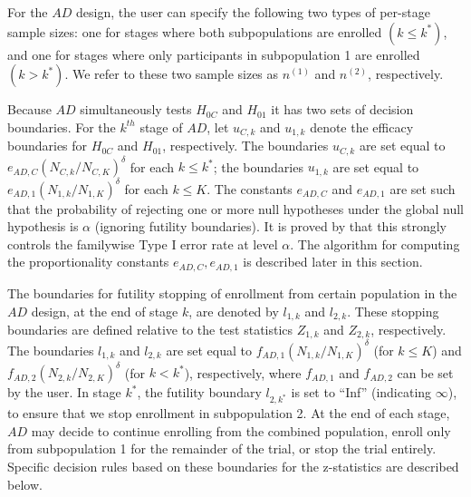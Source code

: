 \documentclass[article]{jss}
\begin{document}
For the $AD$ design, the user can specify the following two types of per-stage sample sizes: one for stages where both subpopulations are enrolled $(k \leq k^*)$, and one for stages where only participants in subpopulation 1 are enrolled $(k > k^*)$. We refer to these two sample sizes as $n^{(1)}$ and $n^{(2)}$, respectively.

Because $AD$ simultaneously tests $H_{0C}$ and $H_{01}$ it has two sets of decision boundaries. For the $k^{th}$ stage of $AD$, let $u_{C,k}$ and $u_{1,k}$ denote the efficacy boundaries for $H_{0C}$ and $H_{01}$, respectively. The boundaries $u_{C,k}$ 
 are set equal to $e_{AD,C}(N_{C,k}/N_{C,K})^{\delta}$ for each $k\leq k^*$; 
the boundaries $u_{1,k}$ are set equal to  $e_{AD,1}(N_{1,k}/N_{1,K})^{\delta}$ for each $k \leq K$. 
The constants $e_{AD,C}$  and $e_{AD,1}$ are set such that the probability of rejecting one or more null hypotheses under the global null hypothesis is $\alpha$ (ignoring futility boundaries). It is proved by \cite{Rosenblum2013AdaptMISTIE} that this strongly controls the familywise Type I error rate at level $\alpha$. The algorithm for computing the proportionality constants $e_{AD,C}, e_{AD,1}$ is described later in this section.


The boundaries for futility stopping of enrollment from certain population in the $AD$ design, at the end of stage $k$, are denoted by $l_{1,k}$ and $l_{2,k}$. These stopping boundaries are defined relative to the test statistics $Z_{1,k}$ and $Z_{2,k}$, respectively. The boundaries $l_{1,k}$ and $l_{2,k}$ are set equal to $f_{AD,1}(N_{1,k}/N_{1,K})^{\delta}$ (for $k\leq K$) and $f_{AD,2}(N_{2,k}/N_{2,K})^{\delta}$ (for $k < k^*$), respectively, where $f_{AD,1}$ and $f_{AD,2}$ can be set by the user.  In stage $k^*$, the futility boundary $l_{2,k^*}$ is set to ``Inf'' (indicating $\infty$), to ensure that we stop enrollment in subpopulation 2. At the end of each stage, $AD$ may decide to continue enrolling from the combined population, enroll only from subpopulation 1 for the remainder of the trial, or stop the trial entirely.  Specific decision rules based on these boundaries for the z-statistics are described below. %
\end{document}
